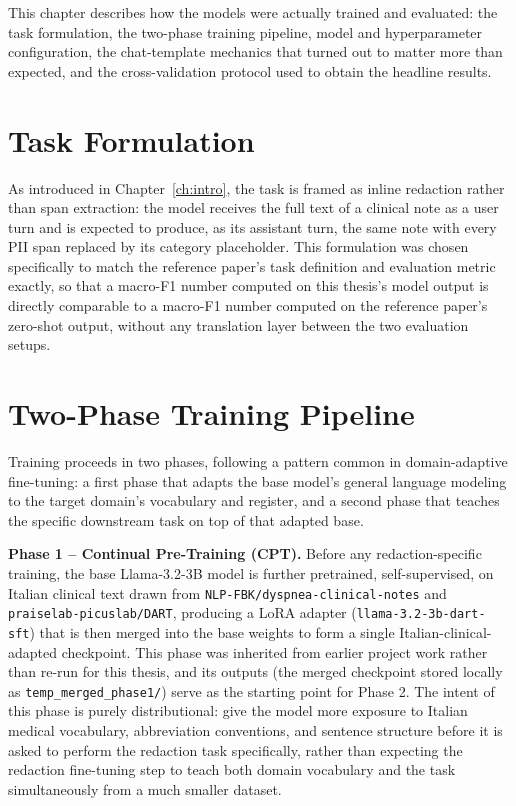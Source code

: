 \documentclass[12pt,a4paper]{report}
\begin{document}
This chapter describes how the models were actually trained and evaluated: the task formulation, the two-phase training pipeline, model and hyperparameter configuration, the chat-template mechanics that turned out to matter more than expected, and the cross-validation protocol used to obtain the headline results.

\section{Task Formulation}

As introduced in Chapter~\ref{ch:intro}, the task is framed as inline redaction rather than span extraction: the model receives the full text of a clinical note as a user turn and is expected to produce, as its assistant turn, the same note with every PII span replaced by its category placeholder. This formulation was chosen specifically to match the reference paper's task definition and evaluation metric exactly, so that a macro-F1 number computed on this thesis's model output is directly comparable to a macro-F1 number computed on the reference paper's zero-shot output, without any translation layer between the two evaluation setups.

\section{Two-Phase Training Pipeline}

Training proceeds in two phases, following a pattern common in domain-adaptive fine-tuning: a first phase that adapts the base model's general language modeling to the target domain's vocabulary and register, and a second phase that teaches the specific downstream task on top of that adapted base.

\textbf{Phase 1 -- Continual Pre-Training (CPT).} Before any redaction-specific training, the base Llama-3.2-3B model is further pretrained, self-supervised, on Italian clinical text drawn from \texttt{NLP-FBK/dyspnea-clinical-notes} and \texttt{praiselab-picuslab/DART}, producing a LoRA adapter (\texttt{llama-3.2-3b-dart-sft}) that is then merged into the base weights to form a single Italian-clinical-adapted checkpoint. This phase was inherited from earlier project work rather than re-run for this thesis, and its outputs (the merged checkpoint stored locally as \texttt{temp\_merged\_phase1/}) serve as the starting point for Phase 2. The intent of this phase is purely distributional: give the model more exposure to Italian medical vocabulary, abbreviation conventions, and sentence structure before it is asked to perform the redaction task specifically, rather than expecting the redaction fine-tuning step to teach both domain vocabulary and the task simultaneously from a much smaller dataset.
\end{document}
